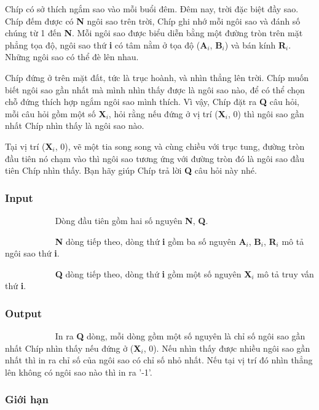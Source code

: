 

Chíp có sở thích ngắm sao vào mỗi buổi đêm. Đêm nay, trời đặc biệt đầy sao. Chíp đếm được có \textbf{N} ngôi sao trên trời, Chíp ghi nhớ mỗi ngôi sao và đánh số chúng từ 1 đến \textbf{N}. Mỗi ngôi sao được biểu diễn bằng một đường tròn trên mặt phẳng tọa độ, ngôi sao thứ \textbf{i} có tâm nằm ở tọa độ (\textbf{A$_i$}, \textbf{B$_i$}) và bán kính \textbf{R$_i$}. Những ngôi sao có thể đè lên nhau.

Chíp đứng ở trên mặt đất, tức là trục hoành, và nhìn thẳng lên trời. Chíp muốn biết ngôi sao gần nhất mà mình nhìn thấy được là ngôi sao nào, để có thể chọn chỗ đứng thích hợp ngắm ngôi sao mình thích. Vì vậy, Chíp đặt ra \textbf{Q} câu hỏi, mỗi câu hỏi gồm một số \textbf{X$_i$}, hỏi rằng nếu đứng ở vị trí (\textbf{X$_i$}, 0) thì ngôi sao gần nhất Chíp nhìn thấy là ngôi sao nào.

Tại vị trí (\textbf{X$_i$}, 0), vẽ một tia song song và cùng chiều với trục tung, đường tròn đầu tiên nó chạm vào thì ngôi sao tương ứng với đường tròn đó là ngôi sao đầu tiên Chíp nhìn thấy. Bạn hãy giúp Chíp trả lời \textbf{Q} câu hỏi này nhé.

\subsubsection{Input}

            Dòng đầu tiên gồm hai số nguyên \textbf{N}, \textbf{Q}.

            \textbf{N} dòng tiếp theo, dòng thứ \textbf{i} gồm ba số nguyên \textbf{A$_i$}, \textbf{B$_i$}, \textbf{R$_i$} mô tả ngôi sao thứ \textbf{i}.

            \textbf{Q} dòng tiếp theo, dòng thứ \textbf{i} gồm một số nguyên \textbf{X$_i$} mô tả truy vấn thứ \textbf{i}.

\subsubsection{Output}

            In ra \textbf{Q} dòng, mỗi dòng gồm một số nguyên là chỉ số ngôi sao gần nhất Chíp nhìn thấy nếu đứng ở (\textbf{X$_i$}, 0). Nếu nhìn thấy được nhiều ngôi sao gần nhất thì in ra chỉ số của ngôi sao có chỉ số nhỏ nhất. Nếu tại vị trí đó nhìn thẳng lên không có ngôi sao nào thì in ra '-1'.

\subsubsection{Giới hạn}

